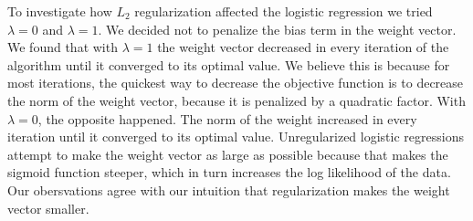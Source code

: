 \documentclass[10pt,twoside]{article}
\begin{document}
\noindent To investigate how $L_2$ regularization affected the logistic regression we tried $\lambda = 0$ and $\lambda = 1$. We decided not to penalize the bias term in the weight vector. We found that with $\lambda = 1$ the weight vector decreased in every iteration of the algorithm until it converged to its optimal value. We believe this is because for most iterations, the quickest way to decrease the objective function is to decrease the norm of the weight vector, because it is penalized by a quadratic factor. With $\lambda = 0$, the opposite happened. The norm of the weight increased in every iteration until it converged to its optimal value. Unregularized logistic regressions attempt to make the weight vector as large as possible because that makes the sigmoid function steeper, which in turn increases the log likelihood of the data. Our obersvations agree with our intuition that regularization makes the weight vector smaller.
\end{document}
